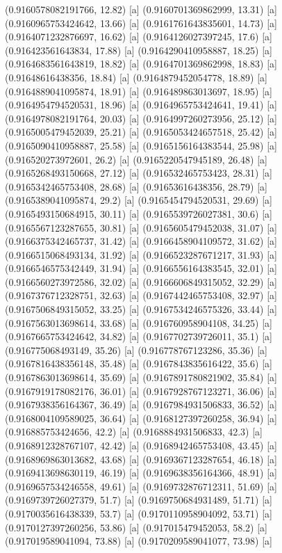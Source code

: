 {{{(0.9160578082191766, 12.82) [a] 
(0.9160701369862999, 13.31) [a] 
(0.9160965753424642, 13.66) [a] 
(0.9161761643835601, 14.73) [a] 
(0.9164071232876697, 16.62) [a] 
(0.9164126027397245, 17.6) [a] 
(0.916423561643834, 17.88) [a] 
(0.9164290410958887, 18.25) [a] 
(0.9164683561643819, 18.82) [a] 
(0.9164701369862998, 18.83) [a] 
(0.91648616438356, 18.84) [a] 
(0.9164879452054778, 18.89) [a] 
(0.9164889041095874, 18.91) [a] 
(0.916489863013697, 18.95) [a] 
(0.9164954794520531, 18.96) [a] 
(0.9164965753424641, 19.41) [a] 
(0.9164978082191764, 20.03) [a] 
(0.9164997260273956, 25.12) [a] 
(0.9165005479452039, 25.21) [a] 
(0.9165053424657518, 25.42) [a] 
(0.9165090410958887, 25.58) [a] 
(0.9165156164383544, 25.98) [a] 
(0.916520273972601, 26.2) [a] 
(0.9165220547945189, 26.48) [a] 
(0.9165268493150668, 27.12) [a] 
(0.916532465753423, 28.31) [a] 
(0.9165342465753408, 28.68) [a] 
(0.91653616438356, 28.79) [a] 
(0.9165389041095874, 29.2) [a] 
(0.9165454794520531, 29.69) [a] 
(0.9165493150684915, 30.11) [a] 
(0.9165539726027381, 30.6) [a] 
(0.9165567123287655, 30.81) [a] 
(0.9165605479452038, 31.07) [a] 
(0.9166375342465737, 31.42) [a] 
(0.9166458904109572, 31.62) [a] 
(0.9166515068493134, 31.92) [a] 
(0.9166523287671217, 31.93) [a] 
(0.9166546575342449, 31.94) [a] 
(0.9166556164383545, 32.01) [a] 
(0.9166560273972586, 32.02) [a] 
(0.9166606849315052, 32.29) [a] 
(0.9167376712328751, 32.63) [a] 
(0.9167442465753408, 32.97) [a] 
(0.9167506849315052, 33.25) [a] 
(0.9167534246575326, 33.44) [a] 
(0.9167563013698614, 33.68) [a] 
(0.916760958904108, 34.25) [a] 
(0.9167665753424642, 34.82) [a] 
(0.9167702739726011, 35.1) [a] 
(0.916775068493149, 35.26) [a] 
(0.916778767123286, 35.36) [a] 
(0.9167816438356148, 35.48) [a] 
(0.9167843835616422, 35.6) [a] 
(0.9167863013698614, 35.69) [a] 
(0.9167891780821902, 35.84) [a] 
(0.9167919178082176, 36.01) [a] 
(0.9167928767123271, 36.06) [a] 
(0.9167938356164367, 36.49) [a] 
(0.9167984931506833, 36.52) [a] 
(0.9168004109589025, 36.64) [a] 
(0.9168127397260258, 36.94) [a] 
(0.916885753424656, 42.2) [a] 
(0.9168884931506833, 42.3) [a] 
(0.9168912328767107, 42.42) [a] 
(0.9168942465753408, 43.45) [a] 
(0.9168969863013682, 43.68) [a] 
(0.9169367123287654, 46.18) [a] 
(0.9169413698630119, 46.19) [a] 
(0.9169638356164366, 48.91) [a] 
(0.9169657534246558, 49.61) [a] 
(0.9169732876712311, 51.69) [a] 
(0.9169739726027379, 51.7) [a] 
(0.9169750684931489, 51.71) [a] 
(0.9170035616438339, 53.7) [a] 
(0.9170110958904092, 53.71) [a] 
(0.9170127397260256, 53.86) [a] 
(0.917015479452053, 58.2) [a] 
(0.917019589041094, 73.88) [a] 
(0.9170209589041077, 73.98) [a] 
}}}
